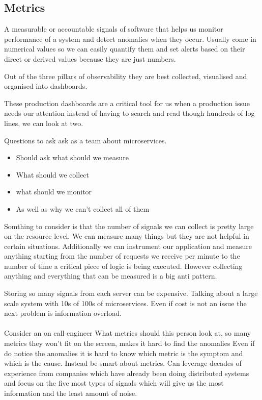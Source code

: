 \subsection{Metrics}
A measurable or accountable signals of software that helps us monitor performance of a system and detect anomalies when they occur.
Usually come in numerical values so we can easily quantify them and set alerts based on their direct or derived values because they are just numbers.

Out of the three pillars of observability they are best collected, visualised and organised into dashboards.

These production dashboards are a critical tool for us when a production issue needs our attention instead of having to search and read though hundreds of log lines, we can look at two.

Questions to ask ask as a team about microservices.
\begin{itemize}
    \item Should ask what should we measure
    \item What should we collect
    \item what should we monitor
    \item As well as why we can't collect all of them
\end{itemize}

Somthing to consider is that the number of signals we can collect is pretty large on the resource level.
We can measure many things but they are not helpful in certain situations.
Additionally we can instrument our application and measure anything starting from the number of requests we receive per minute to the number of time a critical piece of logic is being executed.
However collecting anything and everything that can be measured is a big anti pattern.

Storing so many signals from each server can be expensive.
Talking about a large scale system with 10s of 100s of microservices.
Even if cost is not an issue the next problem is information overload.

\paragraph{}
Consider an on call engineer
What metrics should this person look at, so many metrics they won't fit on the screen, makes it hard to find the anomalies
Even if do notice the anomalies it is hard to know which metric is the symptom and which is the cause.
Instead be smart about metrics.
Can leverage decades of experience from companies which have already been doing distributed systems and focus on the five most types of signals which will give us the most information and the least amount of noise.

